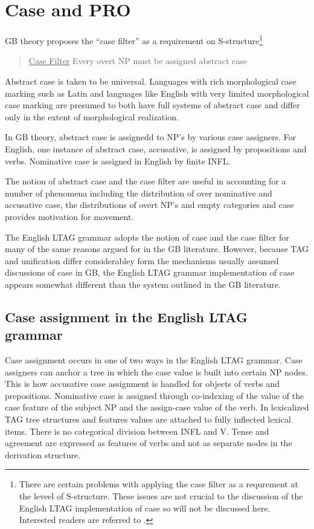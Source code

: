 \section{Case and PRO}

GB theory proposes the ``case filter'' as a requirement on
S-structure\footnote{There are certain problems with applying the case
filter as a requrement at the leveel of S-structure.  These issues are
not crucial to the discussion of the English LTAG implementation of
case so will not be discussed here.  Interested readers are referred
to \cite{LasnikUriagereka}.}

\begin{verse}
\underline{Case Filter}
Every overt NP must be assigned abstract case
\end{verse}

Abstract case is taken to be universal.  Languages with rich
morphological case marking such as Latin and languages like English
with very limited morphological case marking are presumed to both have
full systems of abstract case and differ only in the extent of
morphological realization.

In GB theory, abstract case is assignedd to NP's by various case
assigners.  For English, one instance of abstract case, accusative, is
assigned by propositions and verbs.  Nominative case is assigned in
English by finite INFL.  

The notion of abstract case and the case filter are useful in
accounting for a number of phenomena including the distribution of
over nominative and accusative case, the distributions of overt NP's
and empty categories and case provides motivation for movement.  

The English LTAG grammar adopts the notion of case and the case filter
for many of the same reasons argued for in the GB literature.
However, because TAG and unification differ considerabley form the
mechanisms usually assumed discussions of case in GB, the English LTAG
grammar implementation of case appears somewhat different than the
system outlined in the GB literature.

\subsection{Case assignment in the English LTAG grammar}

Case assignment occurs in one of two ways in the English LTAG grammar.
Case assigners can anchor a tree in which the case value is built into
certain NP nodes.  This is how accusative case assignment is handled
for objects of verbs and prepositions.  Nominative case is assigned
through co-indexing of the value of the case feature of the subject NP
and the assign-case value of the verb.  In lexicalized TAG tree
structures and features values are attached to fully inflected lexical
items.  There is no categorical division between INFL and V.  Tense
and agreement are expressed as features of verbs and not as separate
nodes in the derivation structure.
